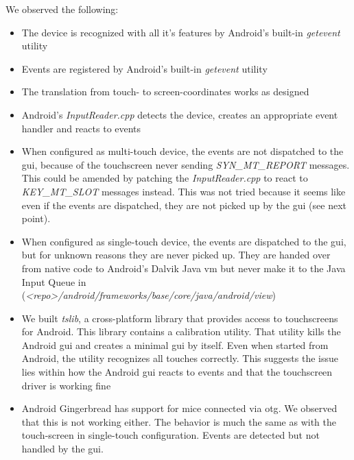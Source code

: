 We observed the following:
\begin{itemize}
	\item The device is recognized with all it's features by Android's built-in
		\emph{getevent} utility
	\item Events are registered by Android's built-in \emph{getevent} utility
	\item The translation from touch- to screen-coordinates works as designed
	\item Android's \emph{InputReader.cpp} detects the device, creates an
		appropriate event handler and reacts to events
	\item When configured as multi-touch device, the events are not dispatched
		to the \gls{gui}, because of the touchscreen never sending
		\emph{SYN\_MT\_REPORT} messages.
		This could be amended by patching the \emph{InputReader.cpp} to react to
		\emph{KEY\_MT\_SLOT} messages instead.
		This was not tried because it seems like even if the events are
		dispatched, they are not picked up by the \gls{gui} (see next point).
	\item When configured as single-touch device, the events are dispatched to
		the \gls{gui}, but for unknown reasons they are never picked up.
		They are handed over from native code to Android's Dalvik Java \gls{vm}
		but never make it to the Java Input Queue in\\
		(\emph{<repo>/android/frameworks/base/core/java/android/view})
	\item We built \emph{tslib}, a cross-platform library that provides access
		to touchscreens for Android.
		This library contains a calibration utility.
		That utility kills the Android \gls{gui} and creates a minimal \gls{gui}
		by itself.
		Even when started from Android, the utility recognizes all touches
		correctly.
		This suggests the issue lies within how the Android \gls{gui} reacts to
		events and that the touchscreen driver is working fine
	\item Android Gingerbread has support for mice connected via \gls{otg}.
		We observed that this is not working either.
		The behavior is much the same as with the touch-screen in single-touch
		configuration.
		Events are detected but not handled by the \gls{gui}.
\end{itemize}

